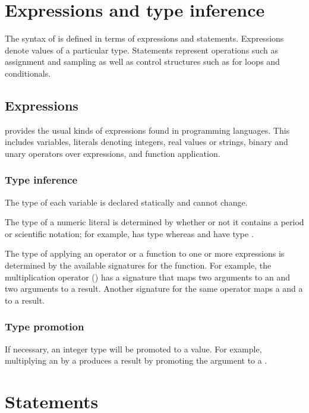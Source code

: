 \documentclass[article]{jss}
\begin{document}
\section{Expressions and type inference}

The syntax of  is defined in terms of expressions and
statements.  Expressions denote values of a particular type.  
Statements represent operations such as assignment and sampling as
well as control structures such as for loops and conditionals.

\subsection{Expressions}

 provides the usual kinds of expressions found in
programming languages.  This includes variables, literals denoting
integers, real values or strings, binary and unary operators over
expressions, and function application.  

\subsubsection{Type inference}

The type of each variable is declared statically and cannot change.  

The type of a numeric literal is determined by whether or not it
contains a period or scientific notation; for example,  has
type  whereas  and  have type
.

The type of applying an operator or a function to one or more
expressions is determined by the available signatures for the
function.  For example, the multiplication operator (\code{*}) has a
signature that maps two  arguments to an  and two
 arguments to a  result.  Another signature for
the same operator maps a  and a  to a
 result.

\subsubsection{Type promotion}

If necessary, an integer type will be promoted to a  value.
For example, multiplying an  by a  produces a
 result by promoting the  argument to a
.  

\section{Statements}
\end{document}
